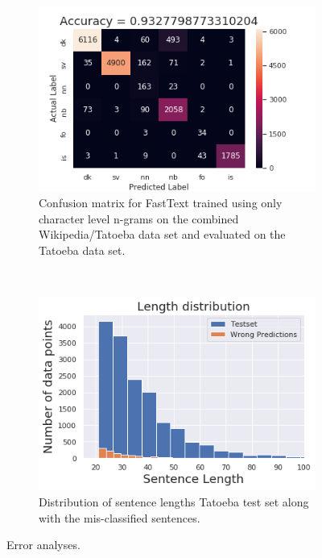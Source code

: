 \begin{figure}
    \begin{subfigure}[b]{0.45\textwidth}
      \includegraphics[scale=0.5]{figs/retrain}
      \caption{Confusion matrix for FastText trained using only character level n-grams on the combined Wikipedia/Tatoeba data set and evaluated on the Tatoeba data set.}
      \label{retrain-confuss}
    \end{subfigure}
    ~
    \begin{subfigure}[b]{0.45\textwidth}
        \includegraphics[scale=0.5]{figs/faliurelengthdist_tatoeba}
        \caption{Distribution of sentence lengths Tatoeba test set along with the mis-classified sentences.}
     \label{retrain-lengths}
    \end{subfigure}
    \caption{Error analyses.}
\end{figure}




